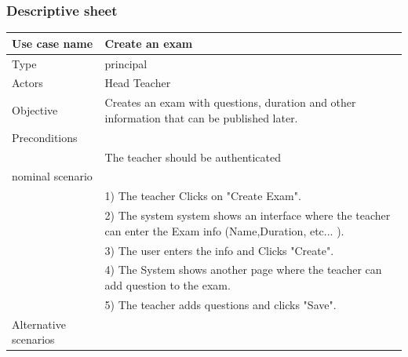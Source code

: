 \documentclass[]{uc2pfecaneva}
\begin{document}
    \subsubsection{Descriptive sheet}
    \begin{table}[h]
        \centering
        \begin{tabularx}{\textwidth}{|l|X|}
            \hline
            Use case name         & Create an exam                                                                                              \\ \hline
            Type                  & principal                                                                                                   \\ \hline
            Actors                & Head Teacher                                                                                                \\ \hline
            Objective             & Creates an exam with questions, duration and other information that can be published later.                 \\ \hline
            Preconditions         &                                                                                                             \\
            & The teacher should be authenticated                                                                         \\ \hline
            nominal scenario      &                                                                                                             \\
            & 1) The teacher Clicks on "Create Exam".                                                                     \\
            & 2) The system system shows an interface where the teacher can enter the Exam info (Name,Duration, etc... ). \\
            & 3) The user enters the info and Clicks "Create".                                                            \\
            & 4) The System shows another page where the teacher can add question to the exam.                            \\
            & 5) The teacher  adds questions and clicks "Save".                                                           \\ \hline
            Alternative scenarios &                                                                                                             \\

\end{tabularx}
\end{table}
\end{document}
